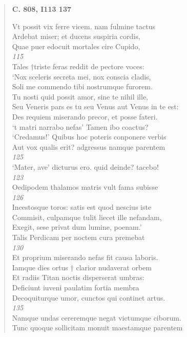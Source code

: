 \documentclass[11pt, a4paper]{report}
\begin{document}
\begin{verse}
    \begin{center} \textbf{C. 808, I113 137} \end{center} \marginpar{[290]} Vt possit vix ferre vicem. nam fulmine tactus \\ Ardebat miser;  \lbrack et \rbrack  ducens suspiria cordis, \\ Quae puer edocuit mortales cire Cupido, \\ \textit{115} \\ Tales †triste feras reddit de pectore voces: \\ ‘Nox sceleris secreta mei, nox conscia cladis, \\ Soli me commendo tibi nostrumque furorem. \\ Tu nosti quid possit amor, sine te nihil ille, \\ Seu Veneris pars es tu seu Venus aut Venus in te est: \\ Des requiem miserando precor, et posse fateri. \\ ‘t matri narrabo nefas’ Tamen ibo coactus? \\ ‘Credamus!’ Quibus hoc poteris conponere verbis \\ Aut vox qualis erit? adgressus namque parentem \\ \textit{125} \\ ‘Mater, ave’ dicturus ero. quid deinde? tacebo! \\ \textit{123} \\ Oedipodem thalamos matris vult fama subisse \\ \textit{126} \\ Incestosque toros: satis est quod nescius iste \\ Commisit, culpamque tulit liecet ille nefandam, \\ Exegit, sese privat dum lumine, poenam.’ \\ Talis Perdicam per noctem cura premebat \\ \textit{130} \\ Et proprium miserando nefas fit causa laboris. \\ Iamque dies ortus † clarior nudaverat orbem \\ Et radiis Titan noctis disperserat umbras: \\ Deficiunt iuveni paulatim fortia membra \\ Decoquiturque umor, cunctos qui continet artus. \\ \textit{135} \\ Namque undas cereremque negat victumque ciborum. \\ Tunc quoque sollicitam monuit maestamque parentem \\ 

\end{verse}
\end{document}
